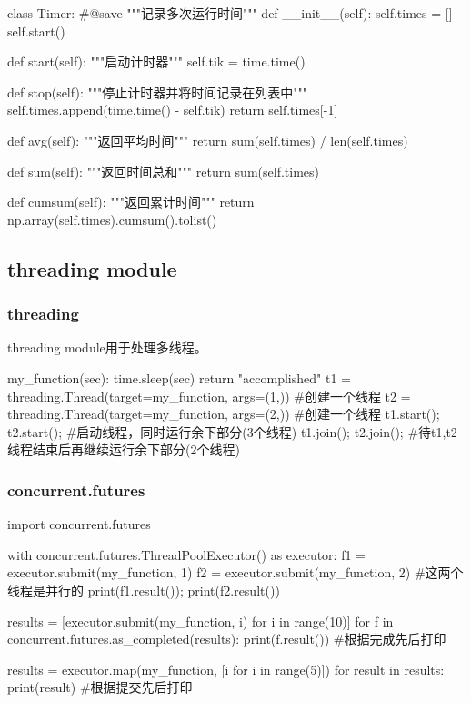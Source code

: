     \begin{codeblock}[language=python, caption={Timer Class}]
      class Timer:  #@save
          """记录多次运行时间"""
          def __init__(self):
              self.times = []
              self.start()

          def start(self):
              """启动计时器"""
              self.tik = time.time()

          def stop(self):
              """停止计时器并将时间记录在列表中"""
              self.times.append(time.time() - self.tik)
              return self.times[-1]

          def avg(self):
              """返回平均时间"""
              return sum(self.times) / len(self.times)

          def sum(self):
              """返回时间总和"""
              return sum(self.times)

          def cumsum(self):
              """返回累计时间"""
              return np.array(self.times).cumsum().tolist()
    \end{codeblock}

  \subsection{threading module}
    \subsubsection{threading}
      threading module用于处理多线程。
      \begin{codeblock}[language=python, caption={threading module}]
        my_function(sec):
            time.sleep(sec)
            return "accomplished"
        t1 = threading.Thread(target=my_function, args=(1,)) #创建一个线程
        t2 = threading.Thread(target=my_function, args=(2,)) #创建一个线程
        t1.start(); t2.start(); #启动线程，同时运行余下部分(3个线程)
        t1.join(); t2.join(); #待t1,t2线程结束后再继续运行余下部分(2个线程)
      \end{codeblock}

    \subsubsection{concurrent.futures}
      \begin{codeblock}[language=python, caption={concurrent.futures module}]
        import concurrent.futures
        
        with concurrent.futures.ThreadPoolExecutor() as executor:
            f1 = executor.submit(my_function, 1) 
            f2 = executor.submit(my_function, 2) #这两个线程是并行的
            print(f1.result()); print(f2.result())

            results = [executor.submit(my_function, i) for i in range(10)]
            for f in concurrent.futures.as_completed(results):
                print(f.result()) #根据完成先后打印

            results = executor.map(my_function, [i for i in range(5)])
            for result in results:
                print(result) #根据提交先后打印
      \end{codeblock}

